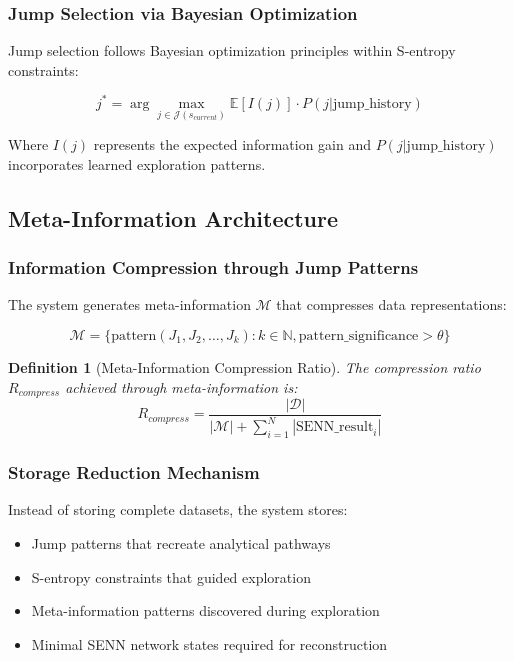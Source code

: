 \documentclass[12pt,a4paper]{article}
\newtheorem{definition}{Definition}
\begin{document}
\subsubsection{Jump Selection via Bayesian Optimization}

Jump selection follows Bayesian optimization principles within S-entropy constraints:

\begin{equation}
j^* = \arg\max_{j \in \mathcal{J}(s_{current})} \mathbb{E}[I(j)] \cdot P(j | \text{jump\_history})
\end{equation}

Where $I(j)$ represents the expected information gain and $P(j | \text{jump\_history})$ incorporates learned exploration patterns.

\subsection{Meta-Information Architecture}

\subsubsection{Information Compression through Jump Patterns}

The system generates meta-information $\mathcal{M}$ that compresses data representations:

\begin{equation}
\mathcal{M} = \{\text{pattern}(J_1, J_2, \ldots, J_k) : k \in \mathbb{N}, \text{pattern\_significance} > \theta\}
\end{equation}

\begin{definition}[Meta-Information Compression Ratio]
The compression ratio $R_{compress}$ achieved through meta-information is:
$$R_{compress} = \frac{|\mathcal{D}|}{|\mathcal{M}| + \sum_{i=1}^{N} |\text{SENN\_result}_i|}$$
\end{definition}

\subsubsection{Storage Reduction Mechanism}

Instead of storing complete datasets, the system stores:
\begin{itemize}
\item Jump patterns that recreate analytical pathways
\item S-entropy constraints that guided exploration
\item Meta-information patterns discovered during exploration
\item Minimal SENN network states required for reconstruction
\end{itemize}
\end{document}
